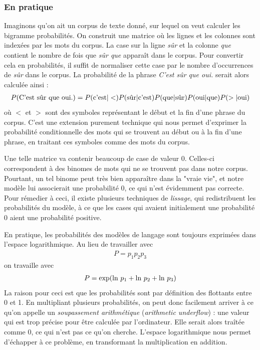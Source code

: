 \documentclass[11pt, a4paper]{report}
\begin{document}
  \subsubsection{En pratique}
  Imaginons qu'on ait un corpus de texte donné, sur lequel on veut calculer les bigramme 
  probabilités. On construit une matrice où les lignes et les colonnes sont indexées par 
  les mots du corpus. La case sur la ligne \textit{sûr} et la colonne \textit{que} contient 
  le nombre de fois que \textit{sûr que} apparaît dans le corpus. Pour convertir cela 
  en probabilités, il suffit de normaliser cette case par le nombre d'occurrences de \textit{sûr}
  dans le corpus. La probabilité de la phrase \textit{C'est sûr que oui.} serait alors 
  calculée ainsi : 
  \begin{align*}
    P(\textup{C'est sûr que oui.}) = P(\textup{c'est}|<)
    P(\textup{sûr}|\textup{c'est})P(\textup{que}|\textup{sûr})
    P(\textup{oui}|\textup{que})P(>|\textup{oui})
  \end{align*}
  où $<$ et $>$ sont des symboles représentant le début et la fin d'une phrase du corpus.
  C'est une extension purement technique qui nous permet d'exprimer la probabilité 
  conditionnelle des mots qui se trouvent au début ou à la fin d'une phrase, en traitant 
  ces symboles comme des mots du corpus. 

  Une telle matrice va contenir beaucoup de case de valeur 0. Celles-ci correspondent à 
  des binomes de mots qui ne se trouvent pas dans notre corpus. Pourtant, un tel binome 
  peut très bien apparaître dans la "vraie vie", et notre modèle lui associerait une 
  probabilité 0, ce qui n'est évidemment pas correcte. Pour rémedier à ceci, il existe 
  plusieurs techniques de \textit{lissage}, qui redistribuent les probabilités du modèle, 
  à ce que les cases qui avaient initialement une probabilité 0 aient une probabilité
  positive. 

  En pratique, les probabilités des modèles de langage sont toujours exprimées dans 
  l'espace logarithmique. Au lieu de travailler avec  
  \begin{align}
    P = p_1 p_2 p_3
  \end{align}
  on travaille avec 
  \begin{align}
    P = \textup{exp}(\textup{ln} \ p_1 + \textup{ln} \ p_2 + \textup{ln} \ p_3)
  \end{align}
  La raison pour ceci est que les probabilités sont par définition des flottants entre 
  0 et 1. En multipliant plusieurs probabilités, on peut donc facilement arriver à ce qu'on 
  appelle un \textit{soupassement arithmétique} (\textit{arithmetic underflow}) : une 
  valeur qui est trop précise pour être calculée par l'ordinateur. Elle serait alors 
  traîtée comme 0, ce qui n'est pas ce qu'on cherche. L'espace logarithmique nous permet 
  d'échapper à ce problème, en transformant la multiplication en addition. 
\end{document}
